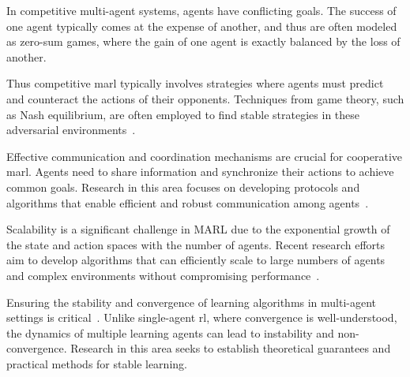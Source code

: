 







In competitive multi-agent systems, agents have conflicting goals. 
The success of one agent typically comes at the expense of another,
and thus are often modeled as zero-sum games, where the 
gain of one agent is exactly balanced by the loss of another.

Thus competitive \gls{marl} typically involves strategies where agents 
must predict and counteract the actions of their opponents. 
Techniques from game theory, such as Nash equilibrium, are often employed 
to find stable strategies in these adversarial environments~\cite{busoniu2008}.



Effective communication and coordination mechanisms are crucial for cooperative \gls{marl}. 
Agents need to share information and synchronize their actions to achieve common goals. 
Research in this area focuses on developing protocols and algorithms that enable efficient and 
robust communication among agents~\cite{sukhbaatar2016,fotouhi2019,hoang2023}.

Scalability is a significant challenge in MARL due to the exponential growth of the state and 
action spaces with the number of agents\cite{cao2012,busoniu2008}. 
Recent research efforts aim to develop algorithms that can efficiently scale to large numbers 
of agents and complex environments without compromising performance~\cite{smit2023,sun2023}.

Ensuring the stability and convergence of learning algorithms in multi-agent settings is 
critical~\cite{papoudakis2021}. 
Unlike single-agent \gls{rl}, where convergence is well-understood, 
the dynamics of multiple learning agents can lead to instability and non-convergence.
Research in this area seeks to establish theoretical guarantees and practical methods 
for stable learning.

